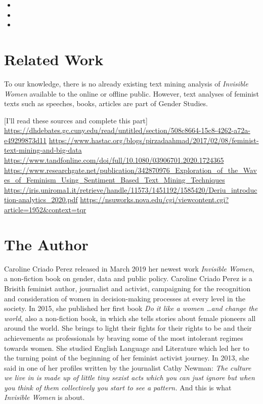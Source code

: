 \documentclass[
]{article}
\providecommand{\tightlist}{%
  \setlength{\itemsep}{0pt}\setlength{\parskip}{0pt}}
\begin{document}
\begin{itemize}
\tightlist
\item
\item
\item
\end{itemize}

\hypertarget{related-work}{%
\section{Related Work}\label{related-work}}

To our knowledge, there is no already existing text mining analysis of
\emph{Invisible Women} available to the online or offline public.
However, text analyses of feminist texts such as speeches, books,
articles are part of Gender Studies.

{[}I'll read these sources and complete this part{]}
\url{https://dhdebates.gc.cuny.edu/read/untitled/section/508c8664-15c8-4262-a72a-e49299873d11}
\url{https://www.hastac.org/blogs/pirzadaahmad/2017/02/08/feminist-text-mining-and-big-data}
\url{https://www.tandfonline.com/doi/full/10.1080/03906701.2020.1724365}
\url{https://www.researchgate.net/publication/342870976_Exploration_of_the_Waves_of_Feminism_Using_Sentiment_Based_Text_Mining_Techniques}
\url{https://iris.uniroma1.it/retrieve/handle/11573/1451192/1585420/Deriu_introduction-analytics_2020.pdf}
\url{https://nsuworks.nova.edu/cgi/viewcontent.cgi?article=1952\&context=tqr}

\hypertarget{the-author}{%
\section{The Author}\label{the-author}}

Caroline Criado Perez released in March 2019 her newest work
\emph{Invisible Women}, a non-fiction book on gender, data and public
policy. Caroline Criado Perez is a Brisith feminist author, journalist
and activist, campaigning for the recognition and consideration of women
in decision-making processes at every level in the society. In 2015, she
published her first book \emph{Do it like a women \ldots and change the
world}, also a non-fiction book, in which she tells stories about female
pioneers all around the world. She brings to light their fights for
their rights to be and their achievements as professionals by braving
some of the most intolerant regimes towards women. She studied English
Language and Literature which led her to the turning point of the
beginning of her feminist activist journey. In 2013, she said in one of
her profiles written by the journalist Cathy Newman: \emph{The culture
we live in is made up of little tiny sexist acts which you can just
ignore but when you think of them collectively you start to see a
pattern.} And this is what \emph{Invisible Women} is about.
\end{document}
